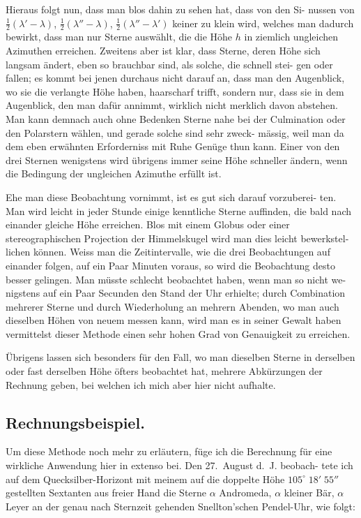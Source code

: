 \documentclass[12pt,a4paper]{article}
\begin{document}
Hieraus folgt nun, dass man blos dahin zu sehen hat, dass von den Si-
nussen von $\frac{1}{2}(\lambda'-\lambda)$, $\frac{1}{2}(\lambda''-\lambda)$, $\frac{1}{2}(\lambda''-\lambda')$ keiner zu klein wird, welches man
dadurch bewirkt, dass man nur Sterne auswählt, die die Höhe $h$ in ziemlich
ungleichen Azimuthen erreichen. Zweitens aber ist klar, dass Sterne, deren
Höhe sich langsam ändert, eben so brauchbar sind, als solche, die schnell stei-
gen oder fallen; es kommt bei jenen durchaus nicht darauf an, dass man den
Augenblick, wo sie die verlangte Höhe haben, haarscharf trifft, sondern nur,
dass sie in dem Augenblick, den man dafür annimmt, wirklich nicht merklich
davon abstehen. Man kann demnach auch ohne Bedenken Sterne nahe bei der
Culmination oder den Polarstern wählen, und gerade solche sind sehr zweck-
mässig, weil man da dem eben erwähnten Erforderniss mit Ruhe Genüge thun
kann. Einer von den drei Sternen wenigstens wird übrigens immer seine Höhe
schneller ändern, wenn die Bedingung der ungleichen Azimuthe erfüllt ist.

Ehe man diese Beobachtung vornimmt, ist es gut sich darauf vorzuberei-
ten. Man wird leicht in jeder Stunde einige kenntliche Sterne auffinden, die
bald nach einander gleiche Höhe erreichen. Blos mit einem Globus oder einer
stereographischen Projection der Himmelskugel wird man dies leicht bewerkstel-
lichen können. Weiss man die Zeitintervalle, wie die drei Beobachtungen auf
einander folgen, auf ein Paar Minuten voraus, so wird die Beobachtung desto
besser gelingen. Man müsste schlecht beobachtet haben, wenn man so nicht we-
nigstens auf ein Paar Secunden den Stand der Uhr erhielte; durch Combination
mehrerer Sterne und durch Wiederholung an mehrern Abenden, wo man auch
dieselben Höhen von neuem messen kann, wird man es in seiner Gewalt haben
vermittelst dieser Methode einen sehr hohen Grad von Genauigkeit zu erreichen.

Übrigens lassen sich besonders für den Fall, wo man dieselben Sterne in
derselben oder fast derselben Höhe öfters beobachtet hat, mehrere Abkürzungen
der Rechnung geben, bei welchen ich mich aber hier nicht aufhalte.

\subsection{Rechnungsbeispiel.}

Um diese Methode noch mehr zu erläutern, füge ich die Berechnung für
eine wirkliche Anwendung hier in extenso bei. Den 27.\ August d.\ J. beobach-
tete ich auf dem Quecksilber-Horizont mit meinem auf die doppelte Höhe
$105^{\circ}\;18'\;55''$ gestellten Sextanten aus freier Hand die Sterne $\alpha$ Andromeda,
$\alpha$ kleiner Bär, $\alpha$ Leyer an der genau nach Sternzeit gehenden Snellton'schen
Pendel-Uhr, wie folgt:
\end{document}
